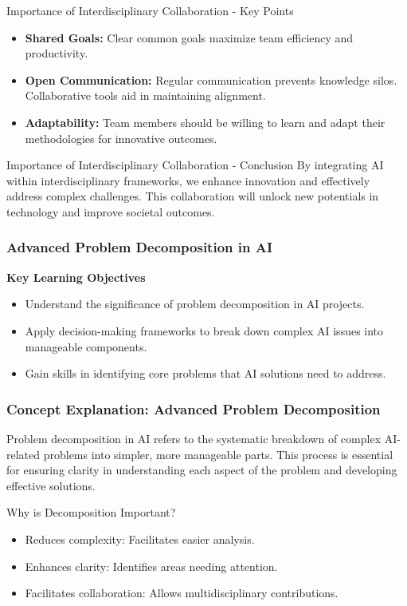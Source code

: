 \documentclass[aspectratio=169]{beamer}
\begin{document}
\begin{frame}[fragile]{Importance of Interdisciplinary Collaboration - Key Points}
  \begin{itemize}
    \item \textbf{Shared Goals:} 
      Clear common goals maximize team efficiency and productivity.
      
    \item \textbf{Open Communication:} 
      Regular communication prevents knowledge silos. Collaborative tools aid in maintaining alignment.
     
    \item \textbf{Adaptability:} 
      Team members should be willing to learn and adapt their methodologies for innovative outcomes.
  \end{itemize}
\end{frame}

\begin{frame}[fragile]{Importance of Interdisciplinary Collaboration - Conclusion}
  By integrating AI within interdisciplinary frameworks, we enhance innovation and effectively address complex challenges. This collaboration will unlock new potentials in technology and improve societal outcomes.
\end{frame}

\begin{frame}[fragile]
    \frametitle{Advanced Problem Decomposition in AI}
    
    \textbf{Key Learning Objectives}
    \begin{itemize}
        \item Understand the significance of problem decomposition in AI projects.
        \item Apply decision-making frameworks to break down complex AI issues into manageable components.
        \item Gain skills in identifying core problems that AI solutions need to address.
    \end{itemize}
\end{frame}

\begin{frame}[fragile]
    \frametitle{Concept Explanation: Advanced Problem Decomposition}
    
    Problem decomposition in AI refers to the systematic breakdown of complex AI-related problems into simpler, more manageable parts. This process is essential for ensuring clarity in understanding each aspect of the problem and developing effective solutions.
    
    \begin{block}{Why is Decomposition Important?}
        \begin{itemize}
            \item Reduces complexity: Facilitates easier analysis.
            \item Enhances clarity: Identifies areas needing attention.
            \item Facilitates collaboration: Allows multidisciplinary contributions.
        \end{itemize}
    \end{block}
\end{frame}
\end{document}
